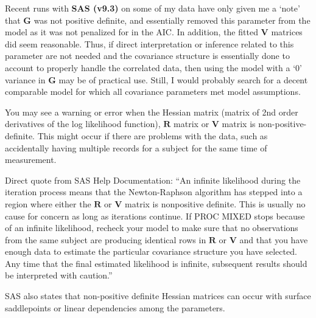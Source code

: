 \documentclass[
  9pt,
  ignorenonframetext,
]{beamer}
\begin{document}
\begin{frame}{}
\protect\hypertarget{section-7}{}
Recent runs with \textbf{SAS (v9.3)} on some of my data have only given
me a `note' that \(\pmb G\) was not positive definite, and essentially
removed this parameter from the model as it was not penalized for in the
AIC. In addition, the fitted \(\pmb V\) matrices did seem reasonable.
Thus, if direct interpretation or inference related to this parameter
are not needed and the covariance structure is essentially done to
account to properly handle the correlated data, then using the model
with a `0' variance in \(\pmb G\) may be of practical use. Still, I
would probably search for a decent comparable model for which all
covariance parameters met model assumptions.

You may see a warning or error when the Hessian matrix (matrix of 2nd
order derivatives of the log likelihood function), \(\pmb R\) matrix or
\(\pmb V\) matrix is non-positive-definite. This might occur if there
are problems with the data, such as accidentally having multiple records
for a subject for the same time of measurement.
\end{frame}

\begin{frame}{}
\protect\hypertarget{section-8}{}
Direct quote from SAS Help Documentation: ``An infinite likelihood
during the iteration process means that the Newton-Raphson algorithm has
stepped into a region where either the \(\pmb R\) or \(\pmb V\) matrix
is nonpositive definite. This is usually no cause for concern as long as
iterations continue. If PROC MIXED stops because of an infinite
likelihood, recheck your model to make sure that no observations from
the same subject are producing identical rows in \(\pmb R\) or
\(\pmb V\) and that you have enough data to estimate the particular
covariance structure you have selected. Any time that the final
estimated likelihood is infinite, subsequent results should be
interpreted with caution.''

SAS also states that non-positive definite Hessian matrices can occur
with surface saddlepoints or linear dependencies among the parameters.
\end{frame}
\end{document}
